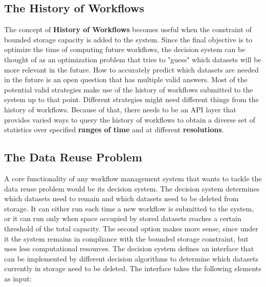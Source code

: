 \subsection{The History of Workflows}
The concept of \textbf{History of Workflows} becomes useful when the constraint of bounded storage capacity is added to the system. Since the final objective is to optimize the time of computing future workflows, the decision system can be thought of as an optimization problem that tries to "guess" which datasets will be more relevant in the future. How to accurately predict which datasets are needed in the future is an open question that has multiple valid answers. Most of the potential valid strategies make use of the history of workflows submitted to the system up to that point.  Different strategies might need different things from the history of workflows. Because of that, there needs to be an API layer that provides varied ways to query the history of workflows to obtain a diverse set of statistics over specified \textbf{ranges of time} and at different \textbf{resolutions}.

\subsection{The Data Reuse Problem}
\label{sec:decision_system}
A core functionality of any workflow management system that wants to tackle the data reuse problem would be its decision system.  The decision system determines which datasets need to remain and which datasets need to be deleted from storage.  It can either run each time a new workflow is submitted to the system, or it can run only when space occupied by stored datasets reaches a certain threshold of the total capacity.  The second option makes more sense, since under it the system remains in compliance with the bounded storage constraint, but uses less computational resources. The decision system defines an interface that can be implemented by different decision algorithms to determine which datasets currently in storage need to be deleted. The interface takes the following elements as input:

